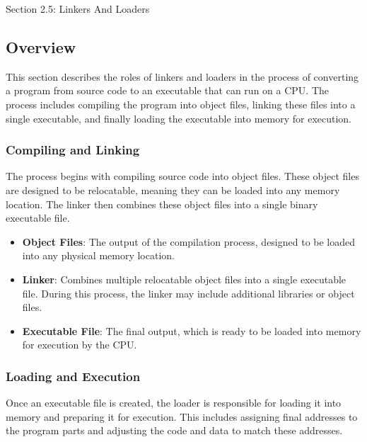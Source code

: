\begin{notes}{Section 2.5: Linkers And Loaders}
    \subsection*{Overview}

    This section describes the roles of linkers and loaders in the process of converting a program from source code to an executable that can run on a CPU. The process includes compiling the program 
    into object files, linking these files into a single executable, and finally loading the executable into memory for execution.
    
    \subsubsection*{Compiling and Linking}
    
    The process begins with compiling source code into object files. These object files are designed to be relocatable, meaning they can be loaded into any memory location. The linker then combines 
    these object files into a single binary executable file.
    
    \begin{highlight}
    
    \begin{itemize}
        \item \textbf{Object Files}: The output of the compilation process, designed to be loaded into any physical memory location.
        \item \textbf{Linker}: Combines multiple relocatable object files into a single executable file. During this process, the linker may include additional libraries or object files.
        \item \textbf{Executable File}: The final output, which is ready to be loaded into memory for execution by the CPU.
    \end{itemize}
    
    \end{highlight}
    
    \subsubsection*{Loading and Execution}
    
    Once an executable file is created, the loader is responsible for loading it into memory and preparing it for execution. This includes assigning final addresses to the program parts and adjusting 
    the code and data to match these addresses.
    

\end{notes}
